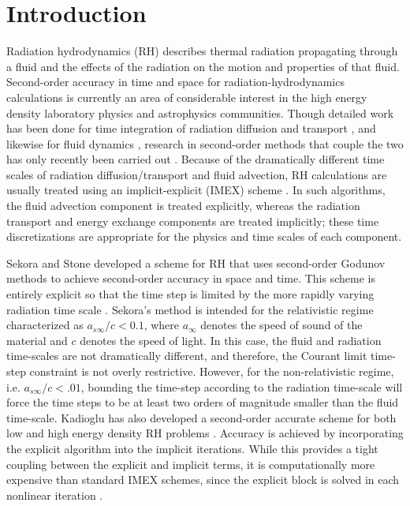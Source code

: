 \documentclass[preprint,12pt]{elsarticle}
\begin{document}
\section{Introduction}
\label{sec:Introduction}

Radiation hydrodynamics (RH) describes thermal radiation propagating through a fluid and the effects of the radiation on the motion and properties of that fluid.  
Second-order accuracy in time and space for radiation-hydrodynamics calculations is currently an area of considerable interest in the high energy density laboratory physics and
astrophysics communities.  Though detailed work has been 
done for time integration of radiation diffusion and transport \cite{mcclarren,lowrie2,knoll,olson,axelrod,stone,brown}, and likewise for fluid 
dynamics \cite{toro}, research in second-order methods that couple the two has only recently been carried out \cite{lowrie,bates,dai}.  Because of the 
dramatically different time scales of radiation diffusion/transport and fluid advection, RH calculations are usually treated using an implicit-explicit 
(IMEX) scheme \cite{lowrie, bates,dai}.  In such algorithms, the fluid advection component is treated explicitly, whereas the radiation transport and energy exchange
components are treated implicitly; these time discretizations are appropriate for the
physics and time scales of each component.

Sekora and Stone developed a scheme for RH that uses second-order Godunov methods to achieve second-order accuracy in space and time.  This scheme is 
entirely explicit so that the time step is limited by the more rapidly varying radiation time scale \cite{sekora}.  Sekora's method is intended for the 
relativistic regime characterized as $a_{s\infty}/c < 0.1$, where $a_{\infty}$ denotes the speed of sound of the material and $c$ denotes the speed of light.  In this case, 
the fluid and radiation time-scales are not dramatically different, and therefore, the Courant limit time-step constraint is not overly restrictive.  
However, for the non-relativistic regime, i.e. $a_{s\infty}/c < .01$, bounding the time-step according to the radiation time-scale will force the time steps 
to be at least two orders of magnitude smaller than the fluid time-scale.  Kadioglu has also developed a second-order accurate scheme for both low and 
high energy density RH problems \cite{kadioglu,kadioglu2}.  Accuracy is achieved by incorporating the explicit algorithm into the implicit iterations. 
While this provides a tight coupling between the explicit and implicit terms, it is computationally more expensive than standard IMEX schemes, since the 
explicit block is solved in each nonlinear iteration \cite{kadioglu}.
\end{document}
